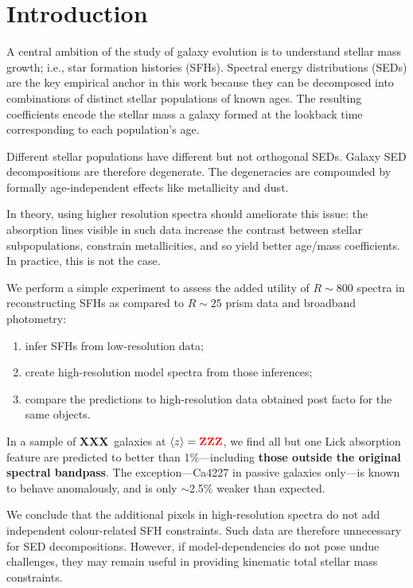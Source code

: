\documentclass[a4paper,fleqn,usenatbib]{mnras}
\newcommand{\bfr}{\bf\color{red}}
\newcommand{\benum}{\begin{enumerate}}
\newcommand{\eenum}{\end{enumerate}}
\newcommand{\ntot}{{\bfr XXX}} %
\newcommand{\midz}{{\bfr ZZZ}} %
\begin{document}
\section{Introduction}
\label{sec:intro}

A central ambition of the study of galaxy evolution is to understand stellar mass growth; i.e., 
star formation histories (SFHs). Spectral energy distributions (SEDs) are the key empirical anchor 
in this work because they can be decomposed into combinations of distinct stellar populations of 
known ages. The resulting coefficients encode the stellar mass a galaxy formed at the lookback time 
corresponding to each population's age.
	
Different stellar populations have different but not orthogonal SEDs. Galaxy SED decompositions 
are therefore degenerate. The degeneracies are compounded by formally age-independent effects 
like metallicity and dust. 

In theory, using higher resolution spectra should ameliorate this issue: the absorption lines visible 
in such data increase the contrast between stellar subpopulations, constrain metallicities, and so yield 
better age/mass coefficients. In practice, this is not the case.

We perform a simple experiment to assess the added utility of $R\sim800$ spectra in 
reconstructing SFHs as compared to $R\sim25$ prism data and broadband photometry: 
\benum
	\item infer SFHs from low-resolution data;
	\item create high-resolution model spectra from those inferences;
	\item compare the predictions to high-resolution data obtained post facto for the same
		objects. 
\eenum

In a sample of \ntot\ galaxies at $\langle z\rangle=\midz$, 
we find all but one Lick absorption feature \citep{Worthey94} are predicted to better than 1\%---including 
{\bfr those outside the original spectral bandpass}. The exception---Ca4227 in passive 
galaxies only---is known to behave anomalously, and is only $\sim$2.5\% weaker than expected. 

We conclude that the additional pixels in high-resolution spectra do not add independent 
colour-related SFH constraints. Such data are therefore unnecessary for SED decompositions.
However, if model-dependencies do not pose undue challenges, they may remain useful
in providing kinematic total stellar mass constraints.
\end{document}
